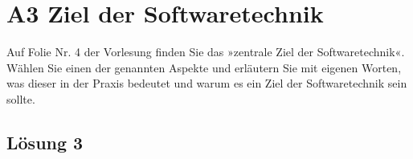 \documentclass[main.tex]{subfiles}
\begin{document}
\section{A3 Ziel der Softwaretechnik}
Auf Folie Nr. 4 der Vorlesung finden Sie das »zentrale Ziel der Softwaretechnik«. Wählen Sie
einen der genannten Aspekte und erläutern Sie mit eigenen Worten, was dieser in der Praxis
bedeutet und warum es ein Ziel der Softwaretechnik sein sollte.

\subsection{Lösung 3}
\end{document}
